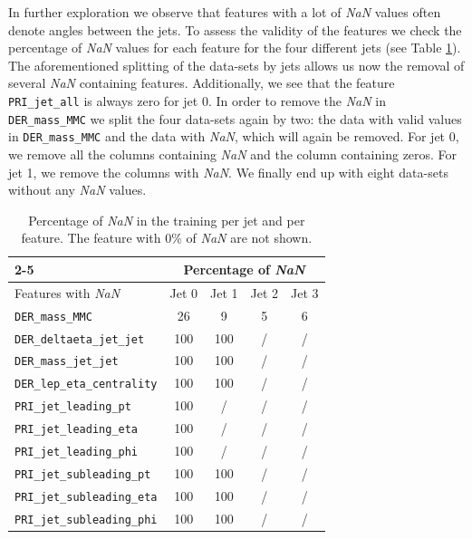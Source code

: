 \documentclass[10pt,conference,compsocconf]{IEEEtran}
\begin{document}
In further exploration we observe that features with a lot of \emph{NaN} values often denote angles between the jets.  To assess the validity of the features we check the percentage of \emph{NaN} values for each feature for the four different jets (see Table \ref{tab:nan}). The aforementioned splitting of the data-sets by jets allows us now the removal of several \emph{NaN} containing features. Additionally, we see that the feature \verb|PRI_jet_all| is always zero for jet 0. In order to remove the \emph{NaN} in \verb|DER_mass_MMC| we split the four data-sets again by two: the data with valid values in \verb|DER_mass_MMC| and the data with \emph{NaN}, which will again be removed. For jet 0, we remove all the columns containing \emph{NaN} and the column containing zeros. For jet 1, we remove the columns with \emph{NaN}. We finally end up with eight data-sets without any \emph{NaN} values. 

\begin{table}[h!]
    \centering
    \begin{tabular}{|l||c|c|c|c|}
        \cline{2-5}
        \multicolumn{1}{}{} & \multicolumn{4}{|c|}{Percentage of \emph{NaN}} \\ \hline
        Features with \emph{NaN} & Jet 0 & Jet 1 & Jet 2 & Jet 3 \\ \hline \hline
         \verb|DER_mass_MMC| & 26 & 9 & 5 & 6 \\
         \verb|DER_deltaeta_jet_jet| & 100 & 100 & / & / \\
         \verb|DER_mass_jet_jet| & 100 & 100 & / & / \\
         \verb|DER_lep_eta_centrality| & 100 & 100 & / & / \\
         \verb|PRI_jet_leading_pt| & 100 & / & / & / \\
         \verb|PRI_jet_leading_eta| & 100 & / & / & / \\ 
         \verb|PRI_jet_leading_phi| & 100 & / & / & / \\ 
         \verb|PRI_jet_subleading_pt| & 100 & 100 & / & / \\ 
         \verb|PRI_jet_subleading_eta| & 100 & 100 & / & / \\
         \verb|PRI_jet_subleading_phi| & 100 & 100 & / & / \\ \hline
    \end{tabular}
    \caption{Percentage of \emph{NaN} in the training per jet and per feature. The feature with 0\% of \emph{NaN} are not shown.\vspace{-0.8cm}}
    \label{tab:nan}
\end{table}
\end{document}
